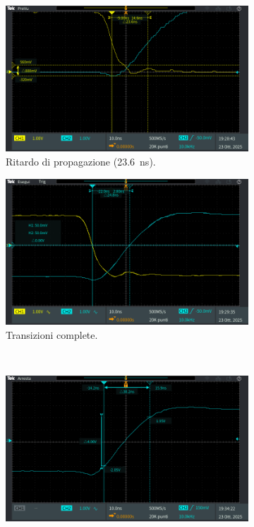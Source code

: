 \documentclass[a4paper,12pt]{article}
\begin{document}
\begin{figure}[H]
    \centering
    \begin{subfigure}[b]{0.48\textwidth}
        \centering
        \includegraphics[width=\linewidth]{immagini/inverter/TEK00100.PNG}
        \caption{Ritardo di propagazione (\SI{23.6}{\nano\second}).}
        \label{fig:ritardo_propagazione}
    \end{subfigure}
    \hfill
    \begin{subfigure}[b]{0.48\textwidth}
        \centering
        \includegraphics[width=\linewidth]{immagini/inverter/TEK00101.PNG}
        \caption{Transizioni complete.}
        \label{fig:transizioni_complete}
    \end{subfigure}
    \\[1em]
    \begin{subfigure}[b]{0.48\textwidth}
        \centering
        \includegraphics[width=\linewidth]{immagini/inverter/TEK00102.PNG}

\end{subfigure}
\end{figure}
\end{document}
